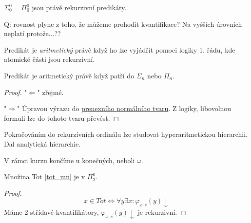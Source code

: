 \begin{observation}
	$\Sigma_0^0 = \Pi_0^0$ jsou právě rekurzivní predikáty.

Q: rovnost plyne z toho, že můžeme prohodit kvantifikace?
Na vyšších úrovních neplatí protože...??
\end{observation}

\begin{definition}
	Predikát je \emph{aritmetický} právě když ho lze vyjádřít pomoci logiky 1. řádu, kde atomické části jsou rekurzivní.
\end{definition}

\begin{observation}
	Predikát je aritmetický právě když patří do $\Sigma_n$ nebo $\Pi_n$.
\end{observation}
\begin{proof}
	"$\Leftarrow$" zřejmé.

	"$\Rightarrow$" Úpravou výrazu do \href{https://en.wikipedia.org/wiki/Prenex_normal_form}{prenexního normálního tvaru}.
	Z logiky, libovolnou formuli lze do tohoto tvaru převést.
\end{proof}

\begin{note}
	Pokračováním do rekurzívních ordinálu lze studovat hyperaritmetickou hierarchii. Dal analytická hierarchie.

	V rámci kurzu končíme u konečných, neboli $\omega$.
\end{note}

\begin{example}\label{tot_pi2}
	Množina Tot \cref{tot_mn} je v $\Pi_2^0$.
\end{example}
\begin{proof}
	\[ x \in Tot \iff \forall y \exists x: \varphi_{x, s}(y) \downarrow \]
	Máme 2 střídavé kvantifikátory, $\varphi_{x, s}(y) \downarrow$ je rekurzivní.
\end{proof}

